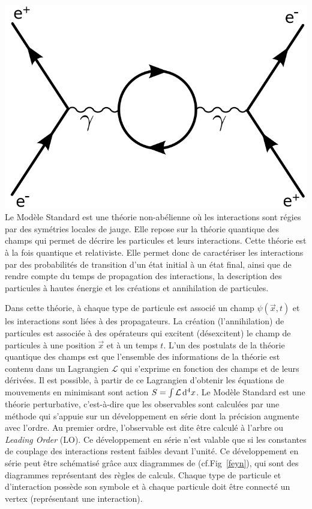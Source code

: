 {	\includegraphics[width=\marginparwidth]{SM/feyn3.png}
	\label{feyn}
}
Le Modèle Standard est une théorie non-abélienne où les interactions sont régies par des symétries locales de jauge. Elle repose sur la théorie quantique des champs qui permet de décrire les particules et leurs interactions. Cette théorie est à la fois quantique et relativiste. Elle permet donc de caractériser les interactions par des probabilités de transition d'un état initial à un état final, ainsi que de rendre compte du temps de propagation des interactions, la description des particules à hautes énergie et les créations et annihilation de particules.

Dans cette théorie, à chaque type de particule est associé un champ $\psi(\vec{x},t)$ et les interactions sont liées à des propagateurs. La création (l'annihilation) de particules est associée à des opérateurs qui excitent (désexcitent) le champ de particules à une position $\vec{x}$ et à un temps $t$. L'un des postulats de la théorie quantique des champs est que l'ensemble des informations de la théorie est contenu dans un Lagrangien $\mathcal{L}$ qui s'exprime en fonction des champs et de leurs dérivées. Il est possible, à partir de ce Lagrangien d'obtenir les équations de mouvements en minimisant sont action $S=\int\mathcal{L}\mathop{}\!\mathrm{d^4}{x}$.
Le Modèle Standard est une théorie perturbative, c'est-à-dire que les observables sont calculées par une méthode qui s'appuie sur un développement en série dont la précision augmente avec l'ordre. Au premier ordre, l'observable est dite être calculé à l'arbre ou \textit{Leading Order} (LO). Ce développement en série n'est valable que si les constantes de couplage des interactions restent faibles devant l'unité. Ce développement en série peut être schématisé grâce aux diagrammes de  (cf.Fig~\ref{feyn}), qui sont des diagrammes représentant des règles de calculs. Chaque type de particule et d'interaction possède son symbole et à chaque particule doit être connecté un vertex (représentant une interaction).

